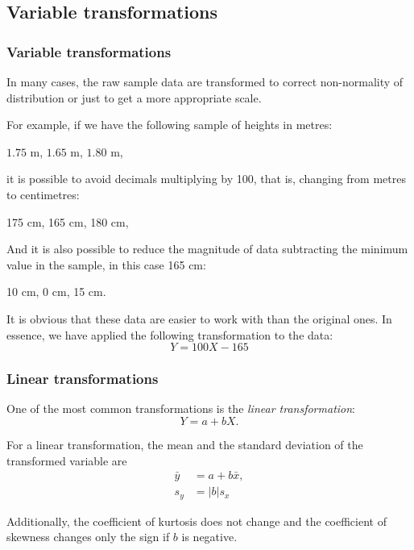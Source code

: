 \subsection{Variable transformations}

\begin{frame}
\frametitle{Variable transformations}
In many cases, the raw sample data are transformed to correct non-normality of distribution or just to get a more appropriate scale.

For example, if we have the following sample of heights in metres:
\begin{center}
$1.75$ m, $1.65$ m, $1.80$ m,
\end{center}
it is possible to avoid decimals multiplying by 100, that is, changing from metres to centimetres:
\begin{center}
175 cm, 165 cm, 180 cm,
\end{center}
And it is also possible to reduce the magnitude of data subtracting the minimum value in the sample, in this case 165 cm:
\begin{center}
10 cm, 0 cm, 15 cm.
\end{center}
It is obvious that these data are easier to work with than the original ones.
In essence, we have applied the following transformation to the data:
\[Y= 100X-165\]
\end{frame}


\begin{frame}
\frametitle{Linear transformations}
One of the most common transformations is the \emph{linear transformation}:
\[
Y=a+bX.
\]

For a linear transformation, the mean and the standard deviation of the transformed variable are
\begin{align*}
\bar y &= a+ b\bar x,\\
s_{y} &= |b|s_{x}
\end{align*}

Additionally, the coefficient of kurtosis does not change and the coefficient of skewness changes only the sign if $b$ is
negative.
\end{frame}


